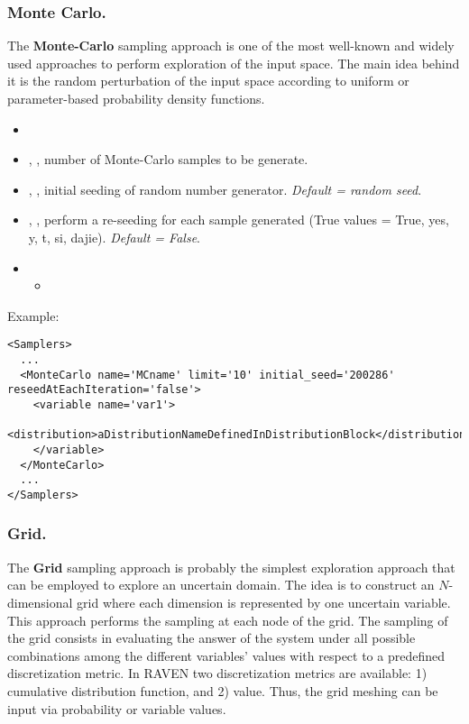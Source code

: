 \subsubsection{Monte Carlo.}
\label{subsubsubsec:MC}
The \textbf{Monte-Carlo} sampling approach is one of the most well-known and
widely used approaches to perform exploration of the input space.
%
The main idea behind it is the random perturbation of the input space according
to uniform or parameter-based probability density functions.
%

%
\attrsIntro
\vspace{-5mm}
\begin{itemize}
\itemsep0em
\item \nameDescription
\item {}, , number of
  Monte-Carlo samples to be generate.
\item {}, , initial
  seeding of random number generator.
  \textit{Default = random seed}.
\item {}, , perform a re-seeding for each sample generated
  (True values = True, yes, y, t, si, dajie).
  \textit{Default = False}.
\end{itemize}
\vspace{-5mm}
\begin{itemize}
\item \variableDescription
 \subnodeIntro
 \begin{itemize}
    \item \distributionDescription
  \end{itemize}
\end{itemize}

Example:
\begin{lstlisting}[style=XML]
<Samplers>
  ...
  <MonteCarlo name='MCname' limit='10' initial_seed='200286' reseedAtEachIteration='false'> 
    <variable name='var1'> 
      <distribution>aDistributionNameDefinedInDistributionBlock</distribution> 	
    </variable> 
  </MonteCarlo>
  ...
</Samplers>
\end{lstlisting}

\subsubsection{Grid.}
\label{subsubsubsec:Grid}
The \textbf{Grid} sampling approach is probably the simplest exploration
approach that can be employed to explore an uncertain domain.
%
The idea is to construct an $N$-dimensional grid where each dimension is
represented by one uncertain variable.
%
This approach performs the sampling at each node of the grid.
%
The sampling of the grid consists in evaluating the answer of the system under
all possible combinations among the different variables' values with respect to
a predefined discretization metric.
%
In RAVEN two discretization metrics are available: 1) cumulative distribution
function, and 2) value.
%
Thus, the grid meshing can be input via probability or variable values.

